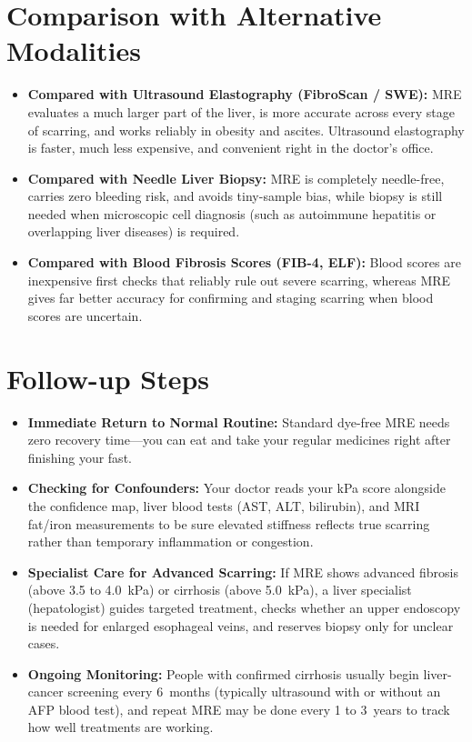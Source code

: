 \section{Comparison with Alternative Modalities}
\begin{itemize}
\item \textbf{Compared with Ultrasound Elastography (FibroScan / SWE):} MRE evaluates a much larger part of the liver, is more accurate across every stage of scarring, and works reliably in obesity and ascites. Ultrasound elastography is faster, much less expensive, and convenient right in the doctor's office.
\item \textbf{Compared with Needle Liver Biopsy:} MRE is completely needle-free, carries zero bleeding risk, and avoids tiny-sample bias, while biopsy is still needed when microscopic cell diagnosis (such as autoimmune hepatitis or overlapping liver diseases) is required.
\item \textbf{Compared with Blood Fibrosis Scores (FIB-4, ELF):} Blood scores are inexpensive first checks that reliably rule out severe scarring, whereas MRE gives far better accuracy for confirming and staging scarring when blood scores are uncertain.
\end{itemize}

\section{Follow-up Steps}
\begin{itemize}
\item \textbf{Immediate Return to Normal Routine:} Standard dye-free MRE needs zero recovery time---you can eat and take your regular medicines right after finishing your fast.
\item \textbf{Checking for Confounders:} Your doctor reads your kPa score alongside the confidence map, liver blood tests (AST, ALT, bilirubin), and MRI fat/iron measurements to be sure elevated stiffness reflects true scarring rather than temporary inflammation or congestion.
\item \textbf{Specialist Care for Advanced Scarring:} If MRE shows advanced fibrosis (above 3.5 to 4.0~kPa) or cirrhosis (above 5.0~kPa), a liver specialist (hepatologist) guides targeted treatment, checks whether an upper endoscopy is needed for enlarged esophageal veins, and reserves biopsy only for unclear cases.
\item \textbf{Ongoing Monitoring:} People with confirmed cirrhosis usually begin liver-cancer screening every 6~months (typically ultrasound with or without an AFP blood test), and repeat MRE may be done every 1 to 3~years to track how well treatments are working.
\end{itemize}

